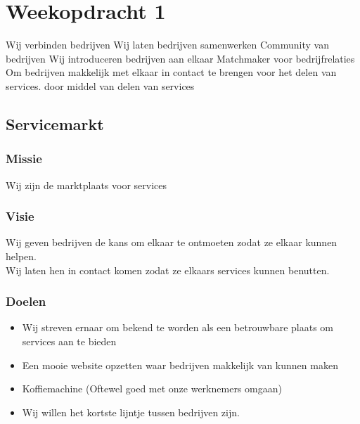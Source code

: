\chapter{Weekopdracht 1}

Wij verbinden bedrijven
Wij laten bedrijven samenwerken
Community van bedrijven
Wij introduceren bedrijven aan elkaar
Matchmaker voor bedrijfrelaties
Om bedrijven makkelijk met elkaar in contact te brengen voor het delen van services.
door middel van delen van services

\section{Servicemarkt}

\subsection{Missie}
Wij zijn de marktplaats voor services


\subsection{Visie}
Wij geven bedrijven de kans om elkaar te ontmoeten zodat ze elkaar kunnen helpen. \\
Wij laten hen in contact komen zodat ze elkaars services kunnen benutten.

\subsection{Doelen}

\begin{itemize}
\item
  Wij streven ernaar om bekend te worden als
  een betrouwbare plaats om services aan te bieden
\item
  Een mooie website opzetten waar bedrijven makkelijk van kunnen maken
\item
  Koffiemachine (Oftewel goed met onze werknemers omgaan)
\item
  Wij willen het kortste lijntje tussen bedrijven zijn.
\end{itemize}